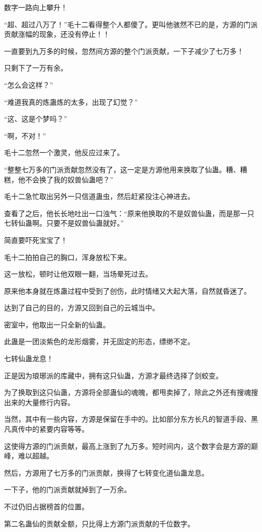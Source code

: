 \begin{this_body}
数字一路向上攀升！

“超、超过八万了！”毛十二看得整个人都傻了。更叫他骇然不已的是，方源的门派贡献涨幅的现象，还没有停止！！

一直要到九万多的时候，忽然间方源的整个门派贡献，一下子减少了七万多！

只剩下了一万有余。

“怎么会这样？”

“难道我真的炼蛊炼的太多，出现了幻觉？”

“这、这是个梦吗？”

“啊，不对！”

毛十二忽然一个激灵，他反应过来了。

“整整七万多的门派贡献忽然没有了，这一定是方源他用来换取了仙蛊。糟、糟糕，他不会换了我的奴兽仙蛊吧？”

毛十二急忙取出另外一只信道蛊虫，然后赶紧投注心神进去。

查看了之后，他长长地吐出一口浊气：“原来他换取的不是奴兽仙蛊，而是那一只七转仙蛊啊。只要不是奴兽仙蛊就好。”

简直要吓死宝宝了！

毛十二拍拍自己的胸口，浑身放松下来。

这一放松，顿时让他双眼一翻，当场晕死过去。

原来他本身就在炼蛊过程中受到了创伤，此时情绪又大起大落，自然就昏迷了。

达到了自己的目的，方源又回到自己的云城当中。

密室中，他取出一只全新的仙蛊。

此蛊是一团淡紫色的龙形烟雾，并无固定的形态，缥缈不定。

七转仙蛊龙息！

正是因为琅琊派的库藏中，拥有这只仙蛊，方源才最终选择了剑蛟变。

为了换取到这只仙蛊，方源将全部蛊仙的魂魄，都甩卖掉了，除此之外还有搜魂搜出来的大量修行内容。

当然，其中有一些内容，方源是保留在手中的。比如部分东方长凡的智道手段、黑凡真传中的紧要内容等等。

这使得方源的门派贡献，最高上涨到了九万多。短时间内，这个数字会是方源的巅峰，难以超越。

然后，方源用了七万多的门派贡献，换得了七转变化道仙蛊龙息。

一下子，他的门派贡献就掉到了一万余。

不过仍旧占据榜首的位置。

第二名蛊仙的贡献全额，只比得上方源门派贡献的千位数字。


\end{this_body}

